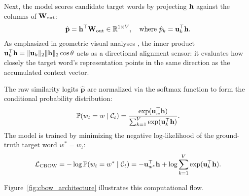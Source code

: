 \documentclass[../../main.tex]{subfiles}
\begin{document}
Next, the model scores candidate target words by projecting $\mathbf{h}$ against the columns of $\mathbf{W}_{\text{out}}$:
\begin{equation}
\label{eq:cbow_logits}
\hat{\mathbf{p}} = \mathbf{h}^\top \mathbf{W}_{\text{out}} \in \mathbb{R}^{1 \times V}, \quad \text{where } \hat{p}_k = \mathbf{u}_k^\top \mathbf{h}.
\end{equation}
As emphasized in geometric visual analyses \cite{sanderson2024embeddings}, the inner product $\mathbf{u}_k^\top \mathbf{h} = \|\mathbf{u}_k\|_2 \|\mathbf{h}\|_2 \cos \theta$ acts as a directional alignment sensor: it evaluates how closely the target word's representation points in the same direction as the accumulated context vector.

The raw similarity logits $\hat{\mathbf{p}}$ are normalized via the softmax function to form the conditional probability distribution:
\begin{equation}
\label{eq:cbow_softmax}
\mathbb{P}(w_t = w \mid \mathcal{C}_t) = \frac{\exp(\mathbf{u}_w^\top \mathbf{h})}{\sum_{k=1}^V \exp(\mathbf{u}_k^\top \mathbf{h})}.
\end{equation}
The model is trained by minimizing the negative log-likelihood of the ground-truth target word $w^* = w_t$:
\begin{equation}
\label{eq:cbow_loss}
\mathcal{L}_{\text{CBOW}} = -\log \mathbb{P}(w_t = w^* \mid \mathcal{C}_t) = -\mathbf{u}_{w^*}^\top \mathbf{h} + \log \sum_{k=1}^V \exp(\mathbf{u}_k^\top \mathbf{h}).
\end{equation}

Figure~\ref{fig:cbow_architecture} illustrates this computational flow.
\end{document}
